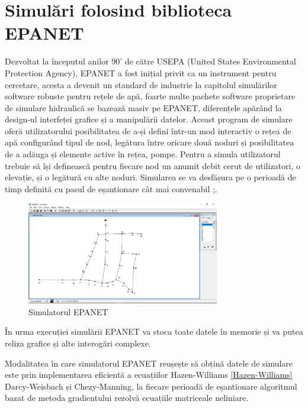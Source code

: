 \section{Simulări folosind biblioteca EPANET}

	Dezvoltat la începutul anilor 90' de către USEPA (United States Environmental Protection Agency), EPANET a fost inițial privit ca un instrument pentru cercetare, acesta a devenit un standard de industrie la capitolul simulărilor software robuste pentru rețele de apă, foarte multe pachete software proprietare de simulare hidraulică se bazează masiv pe EPANET, diferențele apărând la design-ul interfeței grafice și a manipulării datelor. Aceast program de simulare oferă utilizatorului posibilitatea de a-și defini într-un mod interactiv o rețea de apă configurând tipul de nod, legătura între oricare două noduri și posibilitatea de a adăuga și elemente active în rețea, pompe. Pentru a simula utilizatorul trebuie să își definească pentru fiecare nod un anumit debit cerut de utilizatori, o elevație, și o legătură cu alte noduri. Simularea se va desfășura pe o perioadă de timp definită cu pasul de eșantionare cât mai convenabil ;\cite{rossman2000epanet}.
	
\begin{figure}[H]
\centering
\includegraphics[width=0.75\textwidth]{pics/c2_pics/epanet_simulator.png}
\caption{Simulatorul EPANET}
\end{figure}

În urma execuției simulării EPANET va stoca toate datele în memorie și va putea reliza grafice și alte interogări complexe.

Modalitatea în care simulatorul EPANET reușește să obțină datele de simulare este prin implementarea eficientă a ecuațiilor  Hazen-Williams \eqref{Hazen-Williams} Darcy-Weisbach și Chezy-Manning, la fiecare perioadă de eșantionare algoritmul bazat de metoda gradientului rezolvă ecuațiile matriceale neliniare.